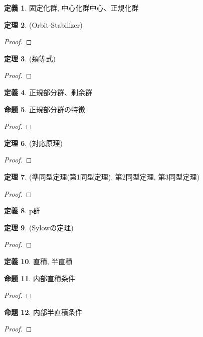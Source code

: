 \documentclass[a4paper, twoside]{bxjsarticle}
\theoremstyle{definition}
\newtheorem{thm}{定理}[subsection]
\newtheorem{prop}[thm]{命題}
\newtheorem{defn}[thm]{定義}
\begin{document}
    \begin{defn}
        固定化群, 中心化群中心、正規化群
    \end{defn}
    \begin{thm}
        (Orbit-Stabilizer) 
    \end{thm}
    \begin{proof}

    \end{proof}
    \begin{thm}
        (類等式)
    \end{thm}
    \begin{proof}

    \end{proof}
    \begin{defn}
        正規部分群、剰余群
    \end{defn}
    \begin{prop}
        正規部分群の特徴
    \end{prop}
    \begin{proof}

    \end{proof}
    \begin{thm}
        (対応原理)
    \end{thm}
    \begin{proof}

    \end{proof}
    \begin{thm}
        (準同型定理(第1同型定理), 第2同型定理, 第3同型定理)
    \end{thm}
    \begin{proof}

    \end{proof}
    \begin{defn}
        p群
    \end{defn}
    \begin{thm}
        (Sylowの定理)
    \end{thm}
    \begin{proof}

    \end{proof}
    \begin{defn}
        直積, 半直積
    \end{defn}
    \begin{prop}
        内部直積条件
    \end{prop}
    \begin{proof}

    \end{proof}
    \begin{prop}
        内部半直積条件
    \end{prop}
    \begin{proof}
    \end{proof}
\end{document}
